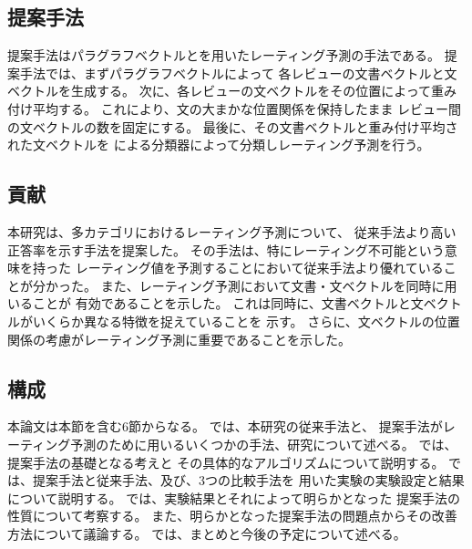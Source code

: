 \subsection{提案手法}

提案手法はパラグラフベクトルと\nn を用いたレーティング予測の手法である。
提案手法では、まずパラグラフベクトル\cite{quoc14}によって
各レビューの文書ベクトルと文ベクトルを生成する。
次に、各レビューの文ベクトルをその位置によって重み付け平均する。
これにより、文の大まかな位置関係を保持したまま
レビュー間の文ベクトルの数を固定にする。
最後に、その文書ベクトルと重み付け平均された文ベクトルを
\nn による分類器によって分類しレーティング予測を行う。


\subsection{貢献}

本研究は、多カテゴリにおけるレーティング予測について、
従来手法\cite{fujitani15}より高い正答率を示す手法を提案した。
その手法は、特にレーティング不可能という意味を持った
レーティング値を予測することにおいて従来手法より優れていることが分かった。
また、レーティング予測において文書・文ベクトルを同時に用いることが
有効であることを示した。
これは同時に、文書ベクトルと文ベクトルがいくらか異なる特徴を捉えていることを
示す。
さらに、文ベクトルの位置関係の考慮がレーティング予測に重要であることを示した。


\subsection{構成}

本論文は本節を含む6節からなる。
では、本研究の従来手法\cite{fujitani15}と、
提案手法がレーティング予測のために用いるいくつかの手法、研究について述べる。
では、提案手法の基礎となる考えと
その具体的なアルゴリズムについて説明する。
では、提案手法と従来手法、及び、3つの比較手法を
用いた実験の実験設定と結果について説明する。
では、実験結果とそれによって明らかとなった
提案手法の性質について考察する。
また、明らかとなった提案手法の問題点からその改善方法について議論する。
では、まとめと今後の予定について述べる。

